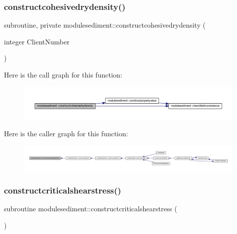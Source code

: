\subsubsection{\texorpdfstring{constructcohesivedrydensity()}{constructcohesivedrydensity()}}
{\footnotesize\ttfamily subroutine, private modulesediment\+::constructcohesivedrydensity (\begin{DoxyParamCaption}\item[{integer}]{Client\+Number }\end{DoxyParamCaption})\hspace{0.3cm}{\ttfamily [private]}}

Here is the call graph for this function\+:\nopagebreak
\begin{figure}[H]
\begin{center}
\leavevmode
\includegraphics[width=350pt]{namespacemodulesediment_adc3a3328a47ba86ef363852158194846_cgraph}
\end{center}
\end{figure}
Here is the caller graph for this function\+:\nopagebreak
\begin{figure}[H]
\begin{center}
\leavevmode
\includegraphics[width=350pt]{namespacemodulesediment_adc3a3328a47ba86ef363852158194846_icgraph}
\end{center}
\end{figure}
\mbox{\label{namespacemodulesediment_a816e46154f7c824c75be6572b099e18a}} 
\subsubsection{\texorpdfstring{constructcriticalshearstress()}{constructcriticalshearstress()}}
{\footnotesize\ttfamily subroutine modulesediment\+::constructcriticalshearstress (\begin{DoxyParamCaption}{ }\end{DoxyParamCaption})\hspace{0.3cm}{\ttfamily [private]}}

